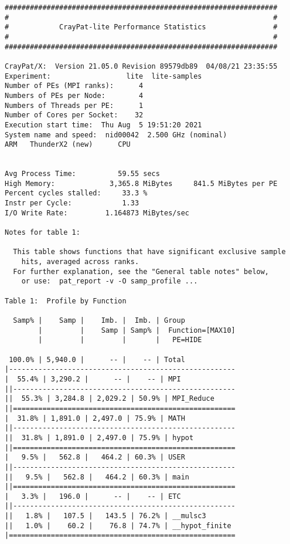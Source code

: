 \begin{verbatim}
#################################################################
#                                                               #
#            CrayPat-lite Performance Statistics                #
#                                                               #
#################################################################

CrayPat/X:  Version 21.05.0 Revision 89579db89  04/08/21 23:35:55
Experiment:                  lite  lite-samples
Number of PEs (MPI ranks):      4
Numbers of PEs per Node:        4
Numbers of Threads per PE:      1
Number of Cores per Socket:    32
Execution start time:  Thu Aug  5 19:51:20 2021
System name and speed:  nid00042  2.500 GHz (nominal)
ARM   ThunderX2 (new)      CPU


Avg Process Time:          59.55 secs              
High Memory:             3,365.8 MiBytes     841.5 MiBytes per PE
Percent cycles stalled:     33.3 %          
Instr per Cycle:            1.33
I/O Write Rate:         1.164873 MiBytes/sec       

Notes for table 1:

  This table shows functions that have significant exclusive sample
    hits, averaged across ranks.
  For further explanation, see the "General table notes" below,
    or use:  pat_report -v -O samp_profile ...

Table 1:  Profile by Function

  Samp% |    Samp |    Imb. |  Imb. | Group
        |         |    Samp | Samp% |  Function=[MAX10]
        |         |         |       |   PE=HIDE
       
 100.0% | 5,940.0 |      -- |    -- | Total
|------------------------------------------------------
|  55.4% | 3,290.2 |      -- |    -- | MPI
||-----------------------------------------------------
||  55.3% | 3,284.8 | 2,029.2 | 50.9% | MPI_Reduce
||=====================================================
|  31.8% | 1,891.0 | 2,497.0 | 75.9% | MATH
||-----------------------------------------------------
||  31.8% | 1,891.0 | 2,497.0 | 75.9% | hypot
||=====================================================
|   9.5% |   562.8 |   464.2 | 60.3% | USER
||-----------------------------------------------------
||   9.5% |   562.8 |   464.2 | 60.3% | main
||=====================================================
|   3.3% |   196.0 |      -- |    -- | ETC
||-----------------------------------------------------
||   1.8% |   107.5 |   143.5 | 76.2% | __mulsc3
||   1.0% |    60.2 |    76.8 | 74.7% | __hypot_finite
|======================================================


\end{verbatim}
